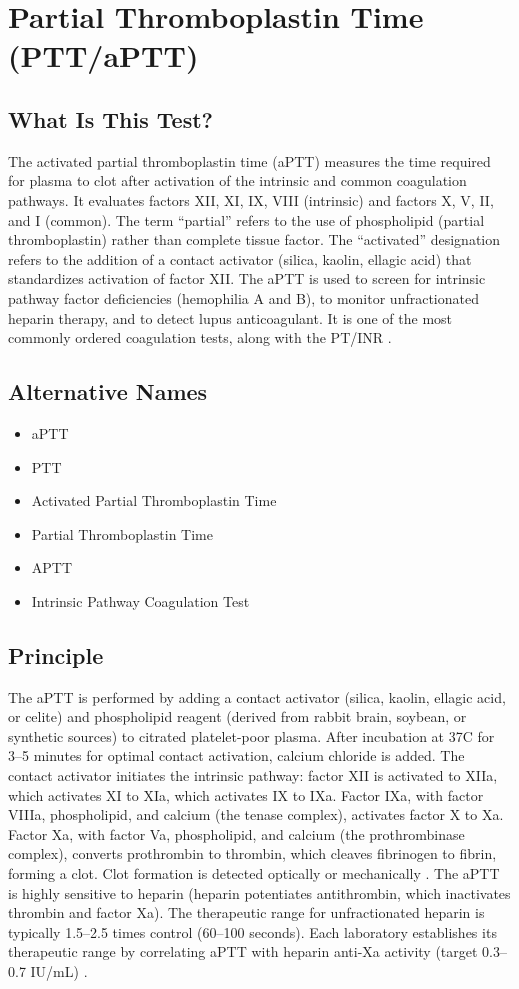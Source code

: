 \chapter{Partial Thromboplastin Time (PTT/aPTT)}

\section*{What Is This Test?}
The activated partial thromboplastin time (aPTT) measures the time required for plasma to clot after activation of the intrinsic and common coagulation pathways. It evaluates factors XII, XI, IX, VIII (intrinsic) and factors X, V, II, and I (common). The term ``partial'' refers to the use of phospholipid (partial thromboplastin) rather than complete tissue factor. The ``activated'' designation refers to the addition of a contact activator (silica, kaolin, ellagic acid) that standardizes activation of factor XII. The aPTT is used to screen for intrinsic pathway factor deficiencies (hemophilia A and B), to monitor unfractionated heparin therapy, and to detect lupus anticoagulant. It is one of the most commonly ordered coagulation tests, along with the PT/INR \cite{tierney2023current}.

\section*{Alternative Names}
\begin{itemize}
  \item aPTT
  \item PTT
  \item Activated Partial Thromboplastin Time
  \item Partial Thromboplastin Time
  \item APTT
  \item Intrinsic Pathway Coagulation Test
\end{itemize}
\section*{Principle}
The aPTT is performed by adding a contact activator (silica, kaolin, ellagic acid, or celite) and phospholipid reagent (derived from rabbit brain, soybean, or synthetic sources) to citrated platelet-poor plasma. After incubation at 37\textdegree{}C for 3--5 minutes for optimal contact activation, calcium chloride is added. The contact activator initiates the intrinsic pathway: factor XII is activated to XIIa, which activates XI to XIa, which activates IX to IXa. Factor IXa, with factor VIIIa, phospholipid, and calcium (the tenase complex), activates factor X to Xa. Factor Xa, with factor Va, phospholipid, and calcium (the prothrombinase complex), converts prothrombin to thrombin, which cleaves fibrinogen to fibrin, forming a clot. Clot formation is detected optically or mechanically \cite{tietz2012textbook}. The aPTT is highly sensitive to heparin (heparin potentiates antithrombin, which inactivates thrombin and factor Xa). The therapeutic range for unfractionated heparin is typically 1.5--2.5 times control (60--100 seconds). Each laboratory establishes its therapeutic range by correlating aPTT with heparin anti-Xa activity (target 0.3--0.7 IU/mL) \cite{kaushansky2021williams}.

